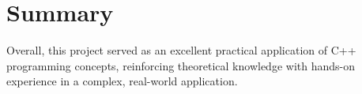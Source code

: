 \section{Summary}
Overall, this project served as an excellent practical application of C++ programming concepts, reinforcing theoretical knowledge with hands-on experience in a complex, real-world application.